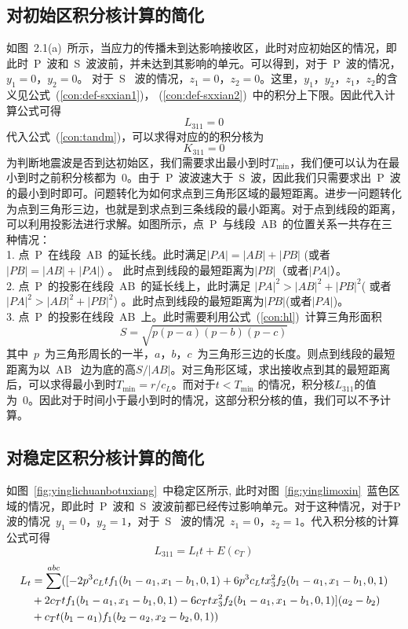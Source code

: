  \subsection{对初始区积分核计算的简化}
        如图~2.1(a)~所示，当应力的传播未到达影响接收区，此时对应初始区的情况，即此时~P~波和~S~波波前，并未达到其影响的单元。可以得到，对于~P~波的情况，$y_1=0$，$y_2=0$。 对于~S~ 波的情况，$z_1=0$，$z_2=0$。这里，$y_1$，$y_2$，$z_1$，$z_2$的含义见公式~(\ref{con:def-sxxian1})， (\ref{con:def-sxxian2})~中的积分上下限。因此代入计算公式可得
		\begin{equation}
			    	L_{311} = 0 
	     \end{equation}
 \noindent 代入公式~(\ref{con:tandm})，可以求得对应的的积分核为
\begin{equation}
    K_{311} =0 
\end{equation}
为判断地震波是否到达初始区，我们需要求出最小到时$T_{\min}$，我们便可以认为在最小到时之前积分核都为~0。由于~P~波波速大于~S~波，因此我们只需要求出~P~波的最小到时即可。问题转化为如何求点到三角形区域的最短距离。进步一问题转化为点到三角形三边，也就是到求点到三条线段的最小距离。对于点到线段的距离，可以利用投影法进行求解。如图所示，点~P~与线段~AB~的位置关系一共存在三种情况：\\
1.	点~P~在线段~AB~的延长线。此时满足$|PA| = |AB|+|PB|$ (或者 $|PB| = |AB|+|PA|$) 。 此时点到线段的最短距离为$|PB|$（或者$|PA|$）。\\
2.	点~P~的投影在线段~AB~的延长线上，此时满足 $|PA|^2 > | AB |^2 +|PB|^2$( 或者$|PA|^2 > | AB |^2 +|PB|^2$) 。此时点到线段的最短距离为$|PB|$(或者$|PA|$)。\\
3.	点~P~的投影在线段~AB~上。此时需要利用公式~(\ref{con:hl})~计算三角形面积
\begin{equation}
    S = \sqrt{p(p-a)(p-b)(p-c)}  \label{con:hl}
\end{equation} 其中~$p$~为三角形周长的一半，$a$，$b$，$c$~为三角形三边的长度。则点到线段的最短距离为以~AB~ 边为底的高$S/|AB|$。对三角形区域，求出接收点到其的最短距离后，可以求得最小到时$T_{\min} = r/c_{L}$。而对于$t<T_{\min}$ 的情况，积分核$L_{311}$的值为~0。因此对于时间小于最小到时的情况，这部分积分核的值，我们可以不予计算。
\subsection{对稳定区积分核计算的简化}
        \indent 如图~\ref{fig:yinglichuanbotuxiang}~中稳定区所示,
此时对图~\ref{fig:yinglimoxin}~蓝色区域的情况，即此时~P~波和~S~波波前都已经传过影响单元。对于这种情况，对于P波的情况~$y_1=0$，$ y_2 = 1$，对于~S~ 波的情况~$z_1 =0$，$z_2 =1$。代入积分核的计算公式可得
	\begin{equation}
     L_{311} =L_{t}t + E(c_T)
	\end{equation}
\begin{align}\notag
L_{t} &=\sum^{abc}( [-2 p ^3c_{L}tf_1(b_{1}-a_{1},x_{1}-b_{1},0,1) + 6p^3c_{L}tx^{2}_{3}f_{2}(b_{1}-a_{1},x_{1}-b_{1},0,1) \\
\notag
&+ 2c_{T}tf_{1}(b_{1}-a_{1},x_{1}-b_{1},0,1) -6c_{T}tx^{2}_{3}f_{2}(b_{1}-a_{1},x_{1}-b_{1},0,1)](a_{2}- b_{2})\\
&+ c_{T}t(b_{1}-a_{1})f_{1}(b_{2}-a_{2},x_{2}-b_{2},0,1))\notag \label{con:Lt}
\end{align}

